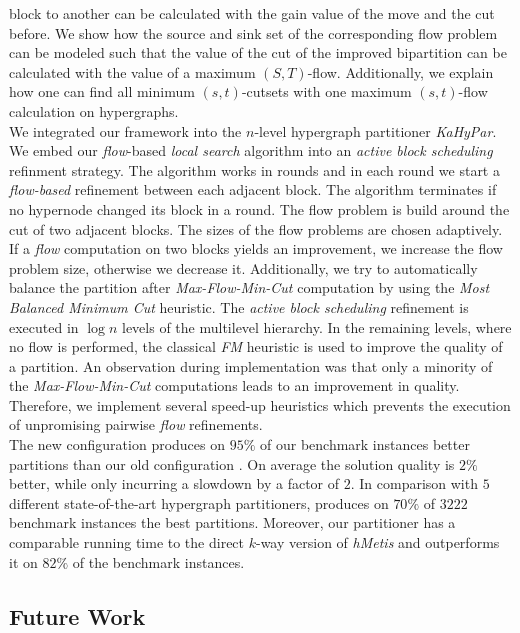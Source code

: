block to another can be calculated with the gain value of the move and the cut before.
We show how the source and sink set of the corresponding flow problem can be modeled such 
that the value of the cut of the improved bipartition can be calculated with the value 
of a maximum $(S,T)$-flow. Additionally, we explain how one can find all 
minimum $(s,t)$-cutsets with one maximum $(s,t)$-flow calculation on hypergraphs. \\
We integrated our framework into the $n$-level hypergraph partitioner
\emph{KaHyPar}. We embed our \emph{flow}-based \emph{local search} algorithm into 
an \emph{active block scheduling} refinment strategy. The algorithm works in rounds and in
each round we start a \emph{flow-based} refinement between each adjacent block. The
algorithm terminates if no hypernode changed its block in a round. The flow problem
is build around the cut of two adjacent blocks.
The sizes of the flow problems are chosen adaptively. If a \emph{flow} computation on two blocks
yields an improvement, we increase the flow problem size, otherwise we decrease it. 
Additionally, we try to automatically balance the partition after \emph{Max-Flow-Min-Cut}
computation by using the \emph{Most Balanced Minimum Cut} heuristic. The \emph{active block
scheduling} refinement is executed in $\log{n}$ levels of the multilevel hierarchy.
In the remaining levels, where no flow is performed, 
the classical \emph{FM} heuristic is used to improve the quality 
of a partition. An observation during implementation was that only a minority of 
the \emph{Max-Flow-Min-Cut} computations leads to an improvement in quality. 
Therefore, we implement several speed-up heuristics which prevents the
execution of unpromising pairwise \emph{flow} refinements. \\
The new configuration  produces on $95\%$ of our benchmark instances
better partitions than our old configuration . On average the solution 
quality is $2\%$ better, while only incurring a slowdown by a factor of $2$. 
In comparison with $5$ different state-of-the-art hypergraph partitioners,  
produces on $70\%$ of $3222$ benchmark instances the best partitions. 
Moreover, our partitioner has a comparable running time to the direct $k$-way
version of \emph{hMetis} and outperforms it on $82\%$ of the benchmark instances.


\subsection{Future Work}

